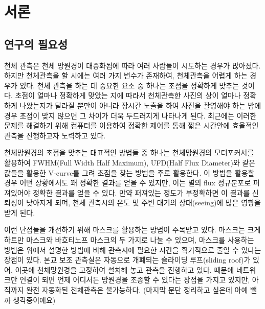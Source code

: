 \documentclass[twoside,11pt]{gshs_thesis}
\begin{document}
\cleardoublepage
\clearpage
\listoffigures	%

\cleardoublepage
\clearpage
\listoftables  %


\cleardoublepage
\clearpage
\renewcommand{\thepage}{\arabic{page}}
\setcounter{page}{1}



\section{서론}
\subsection{연구의 필요성}

천체 관측은 천체 망원경이 대중화됨에 따라 여러 사람들이 시도하는 경우가 많아졌다. 하지만 천체관측을 할 시에는 여러 가지 변수가 존재하여, 천체관측을 어렵게 하는 경우가 있다. 천체 관측을 하는 데 중요한 요소 중 하나는 초점을 정확하게 맞추는 것이다. 초점이 얼마나 정확하게 맞았는 지에 따라서 천체관측한 사진의 상이 얼마나 정확하게 나왔는지가 달라질 뿐만이 아니라 장시간 노출을 하여 사진을 촬영해야 하는 밤에 경우 초점이 맞지 않으면 그 차이가 더욱 두드러지게 나타나게 된다. 최근에는 이러한 문제를 해결하기 위해 컴퓨터를 이용하여 정확한 제어를 통해 짧은 시간안에 효율적인 관측을 진행하고자 노력하고 있다.

천체망원경의 초점을 맞추는 대표적인 방법들 중 하나는 천체망원경의 모터포커서를 활용하여 FWHM(Full Width Half Maximum), UFD(Half Flux Diameter)와 같은 값들을 활용한 V-curve를 그려 초점을 찾는 방법을 주로 활용한다. 이 방법을 활용할 경우 어떤 상황에서도 꽤 정확한 결과를 얻을 수 있지만, 이는 별의 flux 정규분포로 퍼져있어야 정확한 결과를 얻을 수 있다. 만약 퍼져있는 정도가 부정확하면 이 결과를 신뢰성이 낮아지게 되며, 천체 관측시의 온도 및 주변 대기의 상태(seeing)에 많은 영향을 받게 된다.

이런 단점들을 개선하기 위해 마스크를 활용하는 방법이 주목받고 있다. 마스크는 크게 하트만 마스크와 바흐티노프 마스크의 두 가지로 나눌 수 있으며, 마스크를 사용하는 방법은 위에서 설명한 방법에 비해 관측시에 필요한 시간을 획기적으로 줄일 수 있다는 장점이 있다. 
본교 보조 관측실은 자동으로 개폐되는 슬라이딩 루프(sliding roof)가 있어, 이곳에 천체망원경을 고정하여 설치해 놓고 관측을 진행하고 있다. 때문에 네트워크만 연결이 되면 언제 어디서든 망원경을 조종할 수 있다는 장점을 가지고 있지만, 아직까지 완전 자동화된 천체관측은 불가능하다.
(마지막 문단 정리하고 싶은데 아예 뺄까 생각중이에요)
\end{document}
